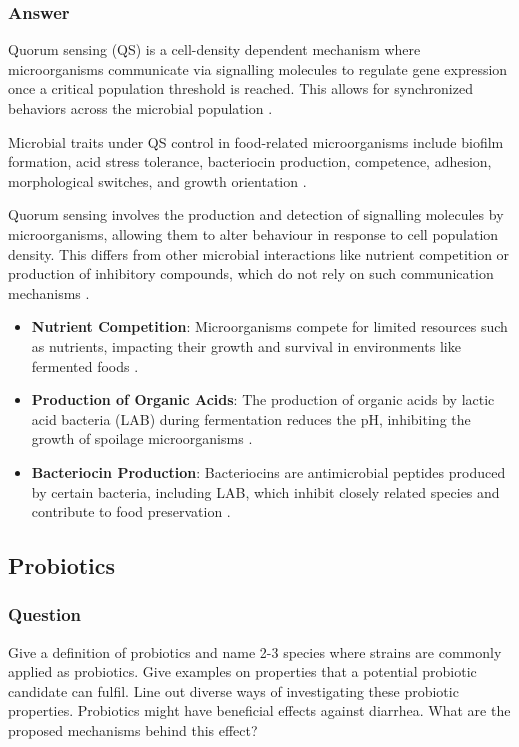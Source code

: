 \subsubsection*{Answer}
Quorum sensing (QS) is a cell-density dependent mechanism where microorganisms communicate via signalling molecules to regulate gene expression once a critical population threshold is reached. This allows for synchronized behaviors across the microbial population \cite*{L8-ImpQuorum}.

Microbial traits under QS control in food-related microorganisms include biofilm formation, acid stress tolerance, bacteriocin production, competence, adhesion, morphological switches, and growth orientation \cite*{L8-ImpQuorum}.

Quorum sensing involves the production and detection of signalling molecules by microorganisms, allowing them to alter behaviour in response to cell population density. This differs from other microbial interactions like nutrient competition or production of inhibitory compounds, which do not rely on such communication mechanisms \cite*{L8-ImpQuorum}.

\begin{itemize}
    \item \textbf{Nutrient Competition}: Microorganisms compete for limited resources such as nutrients, impacting their growth and survival in environments like fermented foods \cite*{L8-ImpQuorum}.
    \item \textbf{Production of Organic Acids}: The production of organic acids by lactic acid bacteria (LAB) during fermentation reduces the pH, inhibiting the growth of spoilage microorganisms \cite*{L8-ImpQuorum}.
    \item \textbf{Bacteriocin Production}: Bacteriocins are antimicrobial peptides produced by certain bacteria, including LAB, which inhibit closely related species and contribute to food preservation \cite*{L8-ImpQuorum}.
\end{itemize}

\subsection{Probiotics}
\subsubsection*{Question}
Give a definition of probiotics and name 2-3 species where strains are commonly applied as probiotics. Give examples on properties that a potential probiotic candidate can fulfil. Line out diverse ways of investigating these probiotic properties. Probiotics might have beneficial effects against diarrhea. What are the proposed mechanisms behind this effect?

